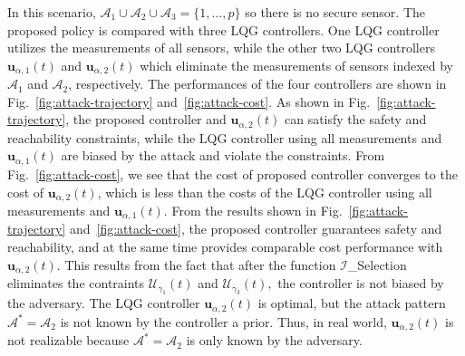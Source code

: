 \documentclass[journal]{IEEEtran}
\begin{document}



In this scenario, $\mathcal{A}_1 \cup \mathcal{A}_2 \cup \mathcal{A}_3 = \{1,\ldots,p\}$ so there is no secure sensor. The proposed policy is compared with three LQG controllers. One LQG controller utilizes the measurements of all sensors, while the other two LQG controllers $\mathbf{u}_{\alpha,1}(t)$ and  $\mathbf{u}_{\alpha,2}(t)$ which eliminate the measurements of sensors indexed by $\mathcal{A}_1$ and $\mathcal{A}_2$, respectively. The performances of the four controllers are shown in Fig.~\ref{fig:attack-trajectory} and~\ref{fig:attack-cost}. As shown in Fig.~\ref{fig:attack-trajectory}, the proposed controller and $\mathbf{u}_{\alpha,2}(t)$ can satisfy the safety and reachability constraints, while the LQG controller using all measurements and $\mathbf{u}_{\alpha,1}(t)$ are biased by the attack and violate the constraints. From Fig.~\ref{fig:attack-cost}, we see that the cost of proposed controller converges to the cost of $\mathbf{u}_{\alpha,2}(t)$, which is less than the costs of the LQG controller using all measurements and $\mathbf{u}_{\alpha,1}(t)$. From the results shown in Fig.~\ref{fig:attack-trajectory} and~\ref{fig:attack-cost}, the proposed controller guarantees safety and reachability, and at the same time provides comparable cost performance with $\mathbf{u}_{\alpha,2}(t).$ This results from the fact that after the function $\mathcal{I}$\_Selection eliminates the contraints $\mathcal{U}_{\gamma_1}(t)$ and $\mathcal{U}_{\gamma_3}(t),$ the controller is not biased by the adversary. The LQG controller $\mathbf{u}_{\alpha,2}(t)$ is optimal, but the attack pattern $\mathcal{A}^\ast = \mathcal{A}_2$ is not known by the controller a prior. Thus, in real world, $\mathbf{u}_{\alpha,2}(t)$ is not realizable because $\mathcal{A}^\ast = \mathcal{A}_2$ is only known by the adversary.
\end{document}

